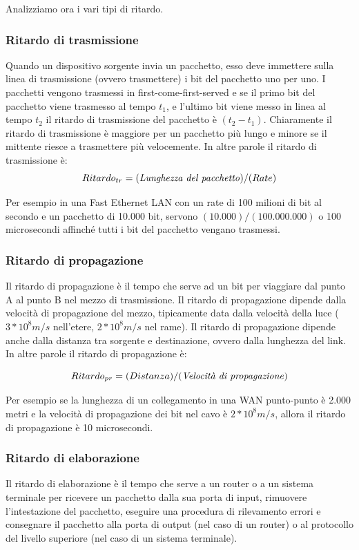 Analizziamo ora i vari tipi di ritardo.

\subsubsection*{Ritardo di trasmissione}
Quando un dispositivo sorgente invia un pacchetto, esso deve immettere sulla linea di trasmissione (ovvero trasmettere) i bit del pacchetto uno per uno. I pacchetti vengono trasmessi in first-come-first-served e se il primo bit del pacchetto viene trasmesso al tempo $t_1$, e l'ultimo bit viene messo in linea al tempo $t_2$ il ritardo di trasmissione del pacchetto è $(t_2 - t_1)$. Chiaramente il ritardo di trasmissione è maggiore per un pacchetto più lungo e minore se il mittente riesce a trasmettere più velocemente. In altre parole il ritardo di trasmissione è:
\begin{equation*}
    Ritardo_{tr} = (\text{\textit{Lunghezza del pacchetto}}) / (Rate)
\end{equation*}

Per esempio in una Fast Ethernet LAN con un rate di 100 milioni di bit al secondo e un pacchetto di 10.000 bit, servono $(10.000)/(100.000.000)$ o 100 microsecondi affinché tutti i bit del pacchetto vengano trasmessi.

\subsubsection*{Ritardo di propagazione}
Il ritardo di propagazione è il tempo che serve ad un bit per viaggiare dal punto A al punto B nel mezzo di trasmissione. Il ritardo di propagazione dipende dalla velocità di propagazione del mezzo, tipicamente data dalla velocità della luce ($3*10^8 m/s$ nell'etere, $2*10^8 m/s$ nel rame). Il ritardo di propagazione dipende anche dalla distanza tra sorgente e destinazione, ovvero dalla lunghezza del link. In altre parole il ritardo di propagazione è:

\begin{equation*}
    Ritardo_{pr} = (Distanza) / (\text{\textit{Velocità di propagazione}})
\end{equation*}

Per esempio se la lunghezza di un collegamento in una WAN punto-punto è 2.000 metri e la velocità di propagazione dei bit nel cavo è $2*10^8 m/s$, allora il ritardo di propagazione è 10 microsecondi.

\subsubsection*{Ritardo di elaborazione}
Il ritardo di elaborazione è il tempo che serve a un router o a un sistema terminale per ricevere un pacchetto dalla sua porta di input, rimuovere l'intestazione del pacchetto, eseguire una procedura di rilevamento errori e consegnare il pacchetto alla porta di output (nel caso di un router) o al protocollo del livello superiore (nel caso di un sistema terminale).

